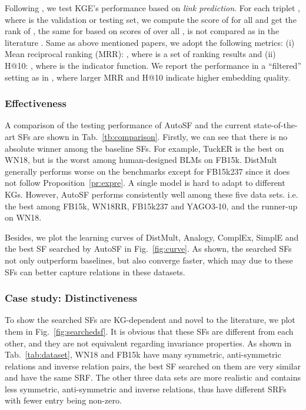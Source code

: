 \documentclass[conference]{IEEEtran}
\begin{document}
Following \cite{yang2014embedding,trouillon2017knowledge,liu2017analogical,kazemi2018simple,dettmers2017convolutional},
we test KGE's performance based on 
\textit{link prediction}.
For each triplet , where  is the validation or testing set,
we compute the score of  for all  and get the rank of ,
the same for  based on scores of  over all ,
 is not compared as in the literature \cite{wang2017knowledge}.
Same as above mentioned papers, 
we adopt the following metrics: 
(i) 
Mean reciprocal ranking (MRR): 
{\small },
where  is a set of ranking results
and
(ii) H@10: 
{\small }, 
where  is the indicator function.
We report the performance in a ``filtered'' setting as in \cite{bordes2013translating,wang2014knowledge},
where larger MRR and H@10 indicate higher embedding quality.





\subsubsection{Effectiveness}
A comparison of the testing performance
of AutoSF and 
the current state-of-the-art SFs
are shown in 
Tab.~\ref{tb:comparison}.
Firstly, we can see that there is no absolute winner among the baseline SFs.
For example,
TuckER is the best on WN18,
but is the worst among human-designed BLMs on FB15k.
DistMult generally performs worse on the benchmarks except for FB15k237
since it does not follow Proposition~\ref{pr:expre}.
A single model is hard to adapt to different KGs.
However,
AutoSF
performs consistently well among
these five data sets.
i.e. 
the best among FB15k, WN18RR, FB15k237 and YAGO3-10,
and the runner-up on WN18.

Besides, we plot the learning curves of DistMult, Analogy, ComplEx, SimplE and the best SF
searched by AutoSF in Fig.~\ref{fig:curve}.
As shown, the searched SFs not only outperform baselines, but also converge faster,
which may due to these SFs can better capture relations in these datasets.



\subsubsection{Case study: Distinctiveness}
\label{ssec:casestufy}

To show the searched SFs are KG-dependent and novel to the literature,
we plot them in Fig.~\ref{fig:searchedsf}.
It is obvious that these SFs are different from each other,
and they are not equivalent regarding invariance properties.
As shown in Tab.~\ref{tab:dataset}, WN18 and FB15k have many symmetric, anti-symmetric relations
and inverse relation pairs, the best SF searched on them are very similar
and have the same SRF.
The other three data sets are more realistic
and contains less symmetric, anti-symmetric and inverse relations,
thus have different SRFs with fewer entry being non-zero.
\end{document}
